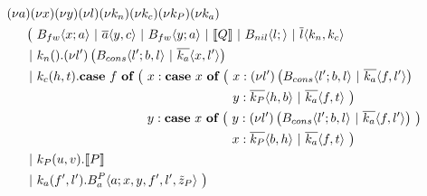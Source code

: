 \begin{align*}
  &\anew{a}{\anew{x}{\anew{y}{\anew{l}{\anew{k_n}{\anew{k_c}{\anew{k_P}{\anew{k_a}{ \\
    &\hspace{0.5cm}
    \begin{aligned}[t]
      \big(\ &\ains{B_{fw}}{x}{a}
      \apar   \asnd{a}{y,c}
      \apar   \ains{B_{fw}}{y}{a}
      \apar   \encMJtoAP{Q}
      \apar   \ains{B_{nil}}{l}{}
      \apar   \asnd{l}{k_n,k_c}
      \\
      \apar  &\arcv{k_n}{} . \anew{l'}{\parens{\ains{B_{cons}}{l'}{b, l} \apar \asnd{k_a}{x, l'}}}
      \\
      \apar  &\arcv{k_c}{h,t} .
        \begin{aligned}[t]
          \acse*{f}{\ 
            &\aalt{x}{
              \begin{aligned}[t]
                \acse*{x}{\ 
                  &\aalt{x}{\anew*{l'}{
                    \ains{B_{cons}}{l'}{b,l} \apar \asnd{k_a}{f,l'}
                  }}\\
                  &\aalt{y}{
                    \asnd{k_P}{h,b} \apar \asnd{k_a}{f,t}
                  }\ 
                }
              \end{aligned}
            }\\
            &\aalt{y}{
              \begin{aligned}[t]
                \acse*{x}{\ 
                  &\aalt{y}{\anew*{l'}{
                    \ains{B_{cons}}{l'}{b,l} \apar \asnd{k_a}{f,l'}
                  }}\\
                  &\aalt{x}{
                    \asnd{k_P}{b,h} \apar \asnd{k_a}{f,t}
                  }\ 
                }
              \end{aligned}
            }\ 
          }
        \end{aligned}
      \\
      \apar  &\arcv{k_P}{u,v} . \encMJtoAP{P}
      \\
      \apar  &\arcv{k_a}{f',l'} . \ains{B_a^P}{a}{x, y, f', l',\tilde{z}_P}
      \ \big)
    \end{aligned}
  }}}}}}}}
\end{align*}


